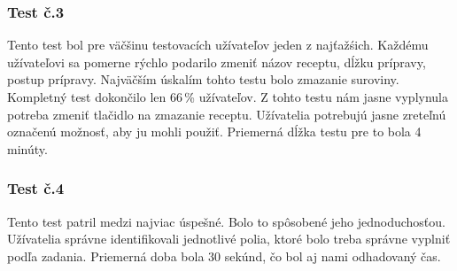\documentclass[12pt,a4paper,titlepage,final]{article}
\begin{document}
\subsubsection{Test č.3}
Tento test bol pre väčšinu testovacích užívateľov jeden z najťažśich. Každému užívateľovi sa pomerne rýchlo podarilo zmeniť názov receptu, dĺžku prípravy, postup prípravy. Najväčším úskalím tohto testu bolo zmazanie suroviny. Kompletný test dokončilo len 66\,\% užívateľov.
Z tohto testu nám jasne vyplynula potreba zmeniť tlačidlo na zmazanie receptu. Užívatelia potrebujú jasne zreteľnú označenú možnosť, aby ju mohli použiť. Priemerná dĺžka testu pre to bola 4 minúty.

\subsubsection{Test č.4} 
Tento test patril medzi najviac úspešné. Bolo to spôsobené jeho jednoduchosťou. Užívatelia správne identifikovali jednotlivé polia, ktoré bolo treba správne vyplniť podľa zadania. Priemerná doba bola 30 sekúnd, čo bol aj nami odhadovaný čas.
\end{document}
